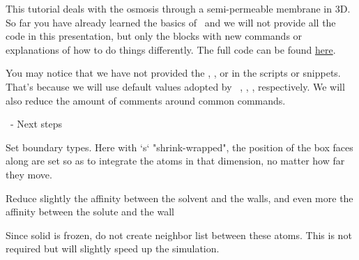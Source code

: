 \begin{frame}[fragile]{\secname}
This tutorial deals with the osmosis through a semi-permeable membrane in 3D. So far you have already learned the basics of \LAMMPS\ and we will not provide all the code in this presentation, but only the blocks with new commands or explanations of how to do things differently. The full code can be found \href{https://github.com/WallyTutor/learning-scientific-computing/tree/main/molecular-dynamics/lammps/tutorials-simon-gravelle/02-Permeable-Membrane}{here}.

\vspace{0.5cm}

You may notice that we have not provided the , , or  in the scripts or snippets. That's because we will use default values adopted by \LAMMPS\, , , , respectively. We will also reduce the amount of comments around common commands.
\end{frame}

\begin{frame}[fragile]{\secname}{\subsecname\ - Next steps}

Set boundary types. Here with `s` "shrink-wrapped", the position of the box faces along  are set so as to integrate the atoms in that dimension, no matter how far they move.

Reduce slightly the affinity between the solvent and the walls, and even more the affinity between the solute and the wall

Since solid is frozen, do not create neighbor list between these atoms. This is not required but will slightly speed up the simulation.
\vspace{0.5cm}

\vspace{0.5cm}

\begin{lstlisting}[language=LAMMPS,basicstyle=\small]
\end{lstlisting}
\end{frame}

\endinput